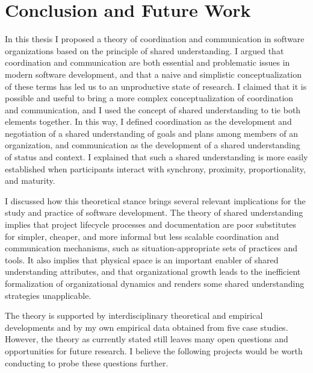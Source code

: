\chapter{Conclusion and Future Work}

In this thesis I proposed a theory of coordination and communication in software organizations based on the principle of shared understanding. I argued that coordination and communication are both essential and problematic issues in modern software development, and that a naive and simplistic conceptualization of these terms has led us to an unproductive state of research. I claimed that it is possible and useful to bring a more complex conceptualization of coordination and communication, and I used the concept of shared understanding to tie both elements together. In this way, I defined coordination as the development and negotiation of a shared understanding of goals and plans among members of an organization, and communication as the development of a shared understanding of status and context. I explained that such a shared understanding is more easily established when participants interact with synchrony, proximity, proportionality, and maturity.

I discussed how this theoretical stance brings several relevant implications for the study and practice of software development. The theory of shared understanding implies that project lifecycle processes and documentation are poor substitutes for simpler, cheaper, and more informal but less scalable coordination and communication mechanisms, such as situation-appropriate sets of practices and tools. It also implies that physical space is an important enabler of shared understanding attributes, and that organizational growth leads to the inefficient formalization of organizational dynamics and renders some shared understanding strategies unapplicable.

The theory is supported by interdisciplinary theoretical and empirical developments and by my own empirical data obtained from five case studies. However, the theory as currently stated still leaves many open questions and opportunities for future research. I believe the following projects would be worth conducting to probe these questions further.

